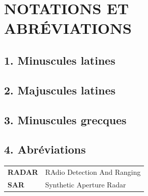 \chapter*{NOTATIONS ET ABRÉVIATIONS}

\section*{1. Minuscules latines}
\section*{2. Majuscules latines}
\section*{3. Minuscules grecques}

\section*{4. Abréviations}
\renewcommand{\arraystretch}{1.3}
\begin{tabular}{p{2.5cm} p{10cm}}
    \textbf{RADAR} & RAdio Detection And Ranging \\
    \textbf{SAR} & Synthetic Aperture Radar \\
\end{tabular}
